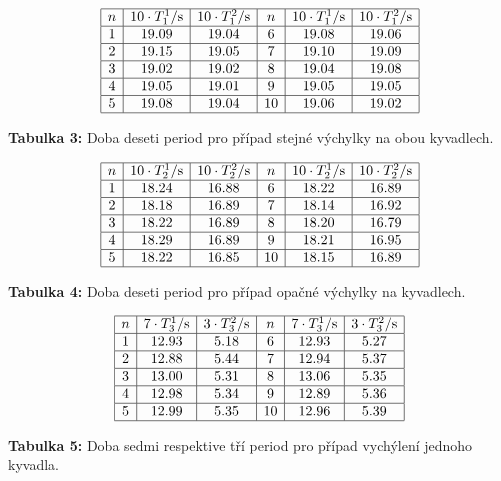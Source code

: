 \documentclass[a4paper,12pt]{article}
\begin{document}
$$
\begin{array}{|c|c|c|c|c|c|}
\hline
	n&	10\cdot T_1^1/\mbox{s}&	10\cdot T_1^2/\mbox{s}&	n&	10\cdot T_1^1/\mbox{s}&	10\cdot T_1^2/\mbox{s} \\ \hline	
	1&	19.09&	19.04&	6&	19.08&	19.06 \\ \hline
	2&	19.15&	19.05&	7&	19.10&	19.09 \\ \hline
	3&	19.02&	19.02&	8&	19.04&	19.08 \\ \hline
	4&	19.05&	19.01&	9&	19.05&	19.05 \\ \hline
	5&	19.08&	19.04&	10&	19.06&	19.02 \\ \hline
\end{array}
$$
\begin{center}
	\textbf{Tabulka 3:} Doba deseti period pro případ stejné výchylky na obou kyvadlech.
\end{center}

$$
\begin{array}{|c|c|c|c|c|c|}
\hline
	n&	10\cdot T_2^1/\mbox{s}&	10\cdot T_2^2/\mbox{s}&	n&	10\cdot T_2^1/\mbox{s}&	10\cdot T_2^2/\mbox{s} \\ \hline	
	1&	18.24&	16.88&	6&	18.22&	16.89 \\ \hline
	2&	18.18&	16.89&	7&	18.14&	16.92 \\ \hline
	3&	18.22&	16.89&	8&	18.20&	16.79 \\ \hline
	4&	18.29&	16.89&	9&	18.21&	16.95 \\ \hline
	5&	18.22&	16.85&	10&	18.15&	16.89 \\ \hline
\end{array}
$$
\begin{center}
	\textbf{Tabulka 4:} Doba deseti period pro případ opačné výchylky na kyvadlech.
\end{center}

$$
\begin{array}{|c|c|c|c|c|c|}
\hline
	n&	7\cdot T_3^1/\mbox{s}&	3\cdot T_3^2/\mbox{s}&	n&	7\cdot T_3^1/\mbox{s}&	3\cdot T_3^2/\mbox{s} \\ \hline	
	1&	12.93&	5.18&	6&	12.93&	5.27 \\ \hline
	2&	12.88&	5.44&	7&	12.94&	5.37 \\ \hline
	3&	13.00&	5.31&	8&	13.06&	5.35 \\ \hline
	4&	12.98&	5.34&	9&	12.89&	5.36 \\ \hline
	5&	12.99&	5.35&	10&	12.96&	5.39 \\ \hline
\end{array}
$$
\begin{center}
	\textbf{Tabulka 5:} Doba sedmi respektive tří period pro případ vychýlení jednoho kyvadla.
\end{center}
\end{document}
